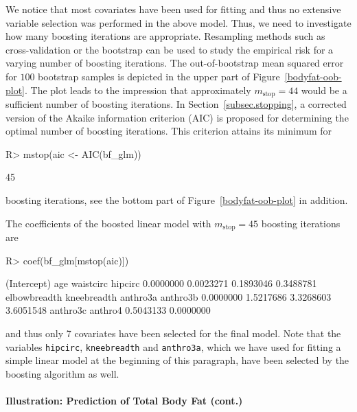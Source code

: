 \documentclass{article}
\newcommand{\Robject}[1]{\texttt{#1}}
\newenvironment{Schunk}{}{}
\begin{document}
We notice that most covariates have been used for fitting
and thus no extensive variable selection was performed in the above model. 
Thus, we need to investigate how many boosting iterations are appropriate. Resampling
methods such as cross-validation or the bootstrap can be used to study the 
empirical risk for a varying number of boosting iterations. The out-of-bootstrap mean 
squared error for $100$ bootstrap samples is depicted in the upper part of 
Figure~\ref{bodyfat-oob-plot}. The plot
leads to the impression that approximately $m_\text{stop} = 44$ would be a sufficient
number of boosting iterations.
In Section~\ref{subsec.stopping}, a corrected version of the Akaike
information criterion (AIC) is proposed for determining the optimal number
of boosting iterations. This criterion attains its 
minimum for
\begin{Schunk}
\begin{Sinput}
R> mstop(aic <- AIC(bf_glm))
\end{Sinput}
\begin{Soutput}
[1] 45
\end{Soutput}
\end{Schunk}
boosting iterations, see the bottom part of
Figure~\ref{bodyfat-oob-plot} in addition.

The coefficients of the boosted linear model with 
$m_\text{stop} = 45$ 
boosting iterations are
\begin{Schunk}
\begin{Sinput}
R> coef(bf_glm[mstop(aic)])
\end{Sinput}
\begin{Soutput}
 (Intercept)          age    waistcirc      hipcirc 
   0.0000000    0.0023271    0.1893046    0.3488781 
elbowbreadth  kneebreadth     anthro3a     anthro3b 
   0.0000000    1.5217686    3.3268603    3.6051548 
    anthro3c      anthro4 
   0.5043133    0.0000000 
\end{Soutput}
\end{Schunk}
and thus only 7 covariates have been selected for the final model. Note that 
the variables \Robject{hipcirc}, \Robject{kneebreadth} and \Robject{anthro3a}, which
we have used for fitting a simple linear model at the beginning of this paragraph, have been 
selected by the boosting algorithm as well.


 

\paragraph{Illustration: Prediction of Total Body Fat (cont.)}
\end{document}
